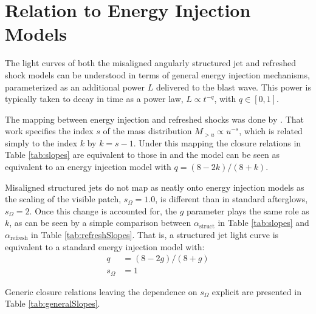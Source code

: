 \documentclass[twocolumn]{aastex62}
\newcommand{\som}{\ensuremath{s_{\Omega}}}
\begin{document}
\section{Relation to Energy Injection Models}

The light curves of both the misaligned angularly structured jet and refreshed shock models can be understood in terms of general energy injection mechanisms, parameterized as an additional power $L$ delivered to the blast wave.  This power is typically taken to decay in time as a power law, $L \propto t^{-q}$, with $q \in [0,1]$.

The mapping between energy injection and refreshed shocks was done by \cite{Zhang:2006aa}.  That work specifies the index $s$ of the mass distribution $M_{>u} \propto u^{-s}$, which is related simply to the index $k$ by $k = s-1$. Under this mapping the closure relations in Table \ref{tab:slopes} are equivalent to those in \cite{Zhang:2006aa} and the model can be seen as equivalent to an energy injection model with $q = (8-2k) / (8+k)$.

Misaligned structured jets do not map as neatly onto energy injection models as the scaling of the visible patch, $\som = 1.0$, is different than in standard afterglows, $\som = 2$. Once this change is accounted for, the $g$ parameter plays the same role as $k$, as can be seen by a simple comparison between $\alpha_{\text{struct}}$ in Table \ref{tab:slopes} and $\alpha_{\text{refresh}}$ in Table \ref{tab:refreshSlopes}.  That is, a structured jet light curve is equivalent to a standard energy injection model with:
\begin{align}
	q &= (8-2g) / (8+g)  \label{eq:struct2ei} \\
	\som &= 1
\end{align}

Generic closure relations leaving the dependence on $\som$ explicit are presented in Table \ref{tab:generalSlopes}. 


%
%
%


%
%

%
%
\end{document}
